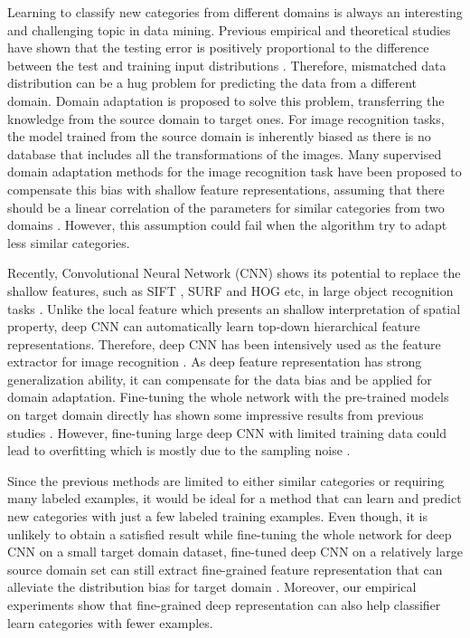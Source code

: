 ﻿Learning to classify new categories from different domains is always an interesting and challenging topic in data mining.
Previous empirical and theoretical studies have shown that the testing error is positively proportional to the difference between the test and training input distributions \cite{ben2007analysis} \cite{blitzer2008learning}. Therefore, mismatched data distribution can be a hug problem for predicting the data from a different domain. Domain adaptation is proposed to solve this problem, transferring the knowledge from the source domain to target ones. For image recognition tasks, the model trained from the source domain is inherently biased as there is no database that includes all the transformations of the images. Many supervised domain adaptation methods for the image recognition task have been proposed to compensate this bias with shallow feature representations, assuming that there should be a linear correlation of the parameters for similar categories from two domains \cite{daume2009frustratingly} \cite{yang2007adapting} \cite{aytar2011tabula}. However, this assumption could fail when the algorithm try to adapt less similar categories.

Recently, Convolutional Neural Network (CNN) shows its potential to replace the shallow features, such as SIFT \cite{lowe1999object}, SURF \cite{bay2006surf} and HOG \cite{dalal2005histograms} etc, in large object recognition tasks \cite{krizhevsky2012imagenet} \cite{zeiler2014visualizing} \cite{simonyan2014very}. Unlike the local feature which presents an shallow interpretation of spatial property, deep CNN can automatically learn top-down hierarchical feature representations. Therefore, deep CNN has been intensively used as the feature extractor for image recognition \cite{farabet2013learning}. As deep feature representation has strong generalization ability, it can compensate for the data bias and be applied for domain adaptation. Fine-tuning the whole network with the pre-trained models on target domain directly has shown some impressive results from previous studies \cite{Chatfield14} \cite{zeiler2014visualizing} \cite{hoffman2013one} \cite{NIPS2014_Zhou}.
However, fine-tuning large deep CNN with limited training data could lead to overfitting which is mostly due to the sampling noise \cite{srivastava2014dropout}.

Since the previous methods are limited to either similar categories or requiring many labeled examples, it would be ideal for a method that can learn and predict new categories with just a few labeled training examples. Even though, it is unlikely to obtain a satisfied result while fine-tuning the whole network for deep CNN on a small target domain dataset, fine-tuned deep CNN on a relatively large source domain set can still extract fine-grained feature representation that can alleviate the distribution bias for target domain \cite{zhang2014part}. Moreover, our empirical experiments show that fine-grained deep representation can also help classifier learn categories with fewer examples.

